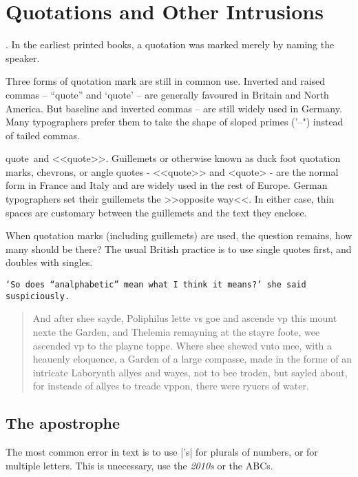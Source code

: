 \chapter{Quotations and Other Intrusions}

. In the earliest printed books, a quotation was marked merely by naming the speaker.

Three forms of quotation mark are still in common use. Inverted and raised commas -- ``quote'' and
`quote' -- are generally favoured in Britain and North America. But baseline and inverted commas --
are still widely used in Germany. Many typographers prefer them to take the shape of
sloped primes ('--") instead of tailed commas. 

\guillemotleft quote\guillemotright\ and <<quote>>. Guillemets or otherwise known as duck foot quotation marks, chevrons, or angle quotes - <<quote>> and <quote> - are the normal form in France and Italy and are widely used in the rest of Europe. German typographers set their guillemets the 
>>opposite way<<. In either case, thin spaces are customary between the guillemets and the text they enclose.

When quotation marks (including guillemets) are used, the question remains, how many should be there?
The usual British practice is to use single quotes first, and doubles with singles.


\texttt{`So does ``analphabetic'' mean what I think it means?' she said suspiciously.}

\begin{quotation}
And after shee sayde, Poliphilus lette vs goe and ascende vp this mount nexte the Garden, and Thelemia remayning at the stayre foote, wee ascended vp to the playne toppe. Where shee shewed vnto mee, with a heauenly eloquence, a Garden of a large compasse, made in the forme of an intricate Laborynth allyes and wayes, not to bee troden, but sayled about, for insteade of allyes to treade vppon, there were ryuers of water.
\end{quotation}

\section{The apostrophe}

The most common error in text is to use |'s| for plurals of numbers, or for multiple letters. This is unecessary, use the \emph{2010s} or the ABCs.


